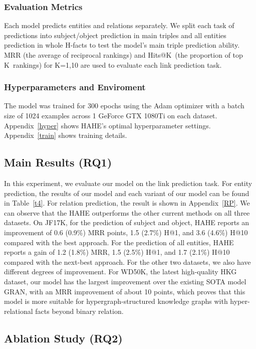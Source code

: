 \documentclass[11pt]{article}
\begin{document}
\subsubsection{Evaluation Metrics}Each model predicts entities and relations separately. We split each task of predictions into subject/object prediction in main triples and all entities prediction in whole H-facts to test the model's main triple prediction ability. MRR (the average of reciprocal rankings) and Hits@K\ (the proportion of top K\ rankings) for K=1,10 are used to evaluate each link prediction task.

\subsubsection{Hyperparameters and Enviroment}
The model was trained for 300 epochs using the Adam optimizer with a batch size of 1024 examples across 1 GeForce GTX 1080Ti on each dataset. Appendix~\ref{hyper} shows HAHE's optimal hyperparameter settings. Appendix~\ref{train} shows training details.

\subsection{Main Results (RQ1)}

In this experiment, we evaluate our model on the link prediction task. For entity prediction, the results of our model and each variant of our model can be found in Table~\ref{t4}. For relation prediction, the result is shown in Appendix~\ref{RP}. We can observe that the HAHE outperforms the other current methods on all three datasets. On JF17K, for the prediction of subject and object, HAHE reports an improvement of 0.6 (0.9\%) MRR points, 1.5 (2.7\%) H@1, and 3.6 (4.6\%) H@10 compared with the best approach. For the prediction of all entities, HAHE reports a gain of 1.2 (1.8\%) MRR, 1.5 (2.5\%) H@1, and 1.7 (2.1\%) H@10 compared with the next-best approach. For the other two datasets, we also have different degrees of improvement. For WD50K, the latest high-quality HKG dataset, our model has the largest improvement over the existing SOTA model GRAN, with an MRR improvement of about 10 points, which proves that this model is more suitable for hypergraph-structured knowledge graphs with hyper-relational facts beyond binary relation.



\subsection{Ablation Study (RQ2)}
\end{document}
